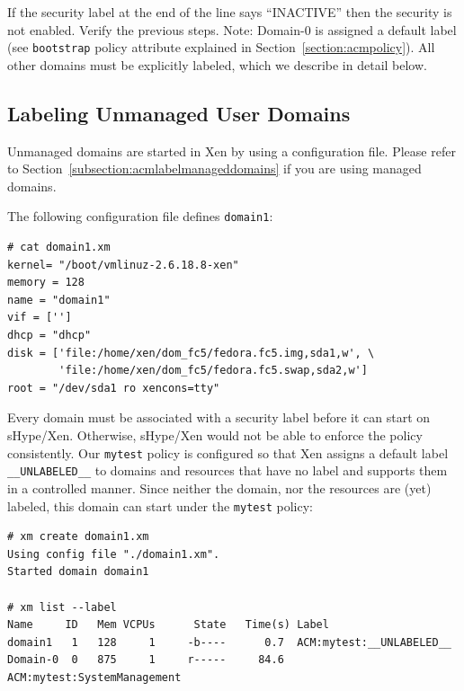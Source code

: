 \documentclass[11pt,twoside,final,openright]{report}
\begin{document}
If the security label at the end of the line says ``INACTIVE'' then the
security is not enabled. Verify the previous steps. Note: Domain-0 is
assigned a default label (see \verb|bootstrap| policy attribute
explained in Section~\ref{section:acmpolicy}). All other domains must
be explicitly labeled, which we describe in detail below.

\subsection{Labeling Unmanaged User Domains}
\label{subsection:acmexamplelabeldomains}

Unmanaged domains are started in Xen by using a configuration
file. Please refer to Section~\ref{subsection:acmlabelmanageddomains}
if you are using managed domains.

The following configuration file defines \verb|domain1|:

\begin{scriptsize}
\begin{verbatim}
# cat domain1.xm
kernel= "/boot/vmlinuz-2.6.18.8-xen"
memory = 128
name = "domain1"
vif = ['']
dhcp = "dhcp"
disk = ['file:/home/xen/dom_fc5/fedora.fc5.img,sda1,w', \
        'file:/home/xen/dom_fc5/fedora.fc5.swap,sda2,w']
root = "/dev/sda1 ro xencons=tty"
\end{verbatim}
\end{scriptsize}

Every domain must be associated with a security label before it can start
on sHype/Xen. Otherwise, sHype/Xen would not be able to enforce the policy
consistently. Our \verb|mytest| policy is configured so that Xen
assigns a default label \verb|__UNLABELED__| to domains and resources that
have no label and supports them in a controlled manner. Since neither the domain,
nor the resources are (yet) labeled, this domain can start under the \verb|mytest|
policy:

\begin{scriptsize}
\begin{verbatim}
# xm create domain1.xm
Using config file "./domain1.xm".
Started domain domain1

# xm list --label
Name     ID   Mem VCPUs      State   Time(s) Label
domain1   1   128     1     -b----      0.7  ACM:mytest:__UNLABELED__
Domain-0  0   875     1     r-----     84.6  ACM:mytest:SystemManagement
\end{verbatim}
\end{scriptsize}
\end{document}
